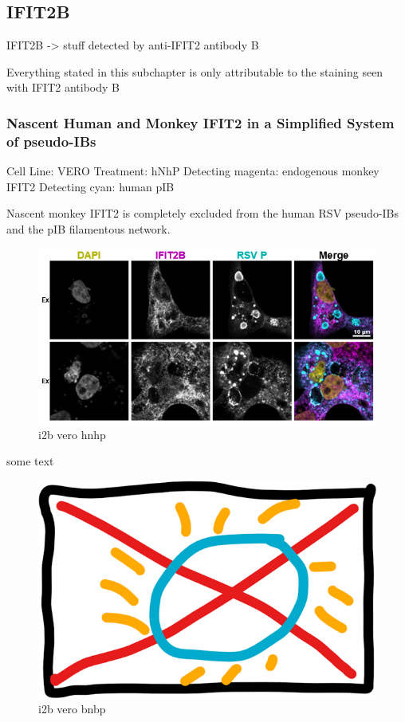 \subsection{IFIT2B}
IFIT2B -> stuff detected by anti-IFIT2 antibody B

Everything stated in this subchapter is only attributable to the staining seen with IFIT2 antibody B
\subsubsection{Nascent Human and Monkey IFIT2 in a Simplified System of pseudo-IBs} \label{Nascent Human and Monkey IFIT2 in a Simplified System of pseudo-IBs}
Cell Line: VERO \newline
Treatment: hNhP \newline
Detecting magenta: endogenous monkey IFIT2 \newline
Detecting cyan: human pIB \newline

Nascent monkey IFIT2 is completely excluded from the human RSV pseudo-IBs and the pIB filamentous network.

\begin{figure}
    \centering
    \includegraphics[width=1\linewidth]{09. Chapter 4//Figs//02. I2B/01. i2b vero hnhp.png}
    \caption[i2b vero hnhp]{i2b vero hnhp}
    \label{i2b vero hnhp}
\end{figure}

some text

\begin{figure}
    \centering
    \includegraphics[width=0.5\linewidth]{09. Chapter 4//Figs//02. I2B/00. placeholder.png}
    \caption[i2b vero bnbp]{i2b vero bnbp}
    \label{i2b vero bnbp}
\end{figure}

